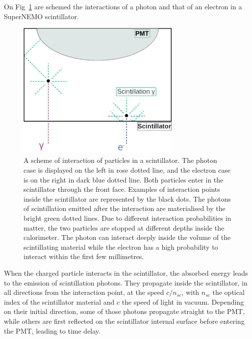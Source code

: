 On Fig~\ref{fig:photon_scintilator} are schemed the interactions of a photon and that of an electron in a SuperNEMO scintillator.
\begin{figure}[h]
  \centering
  \includegraphics[width=8cm]{commissioning/fig_commissioning/Co_multi_reflection.pdf}
  \caption{A scheme of interaction of particles in a scintillator.
    The photon case is displayed on the left in rose dotted line, and the electron case is on the right in dark blue dotted line.
    Both particles enter in the scintillator through the front face.
    Examples of interaction points inside the scintillator are represented by the black dots.
    The photons of scintillation emitted after the interaction are materialised by the bright green dotted lines.
    Due to different interaction probabilities in matter, the two particles are stopped at different depths inside the calorimeter.
    The photon can interact deeply inside the volume of the scintillating material while the electron has a high probability to interact within the first few millimetres.
    \label{fig:photon_scintilator}}
\end{figure}
When the charged particle interacts in the scintillator, the absorbed energy leads to the emission of scintillation photons.
They propagate inside the scintillator, in all directions from the interaction point, at the speed $c/n_{sc}$, with $n_{sc}$ the optical index of the scintillator material and $c$ the speed of light in vacuum.
Depending on their initial direction, some of those photons propagate straight to the PMT, while others are first reflected on the scintillator internal surface before entering the PMT, leading to time delay.

